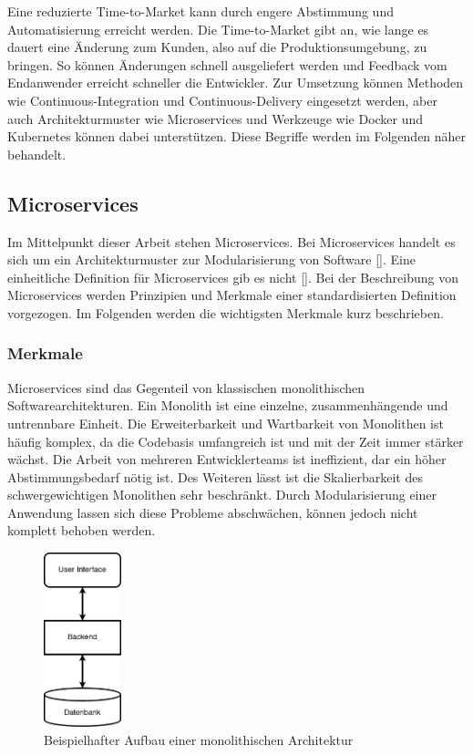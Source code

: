 Eine reduzierte Time-to-Market kann durch engere Abstimmung und Automatisierung erreicht werden. Die Time-to-Market gibt an, wie lange es dauert eine Änderung zum Kunden, also auf die Produktionsumgebung, zu bringen. So können Änderungen schnell ausgeliefert werden und Feedback vom Endanwender erreicht schneller die Entwickler. Zur Umsetzung können Methoden wie Continuous-Integration und Continuous-Delivery eingesetzt werden, aber auch Architekturmuster wie Microservices und Werkzeuge wie Docker und Kubernetes können dabei unterstützen. Diese Begriffe werden im Folgenden näher behandelt.

\subsection{Microservices}

Im Mittelpunkt dieser Arbeit stehen Microservices. Bei Microservices handelt es sich um ein Architekturmuster zur Modularisierung von Software [\cite[S. 15]{newmanMicroservices2015}]. Eine einheitliche Definition für Microservices gib es nicht [\cite[S. 2]{wolffMicroservices2018}]. Bei der Beschreibung von Microservices werden Prinzipien und Merkmale einer standardisierten Definition vorgezogen. Im Folgenden werden die wichtigsten Merkmale kurz beschrieben.

\subsubsection{Merkmale}

Microservices sind das Gegenteil von klassischen monolithischen Softwarearchitekturen. Ein Monolith ist eine einzelne, zusammenhängende und untrennbare Einheit. Die Erweiterbarkeit und Wartbarkeit von Monolithen ist häufig komplex, da die Codebasis umfangreich ist und mit der Zeit immer stärker wächst. Die Arbeit von mehreren Entwicklerteams ist ineffizient, dar ein höher Abstimmungsbedarf nötig ist. Des Weiteren lässt ist die Skalierbarkeit des schwergewichtigen Monolithen sehr beschränkt. Durch Modularisierung einer Anwendung lassen sich diese Probleme abschwächen, können jedoch nicht komplett behoben werden.

\begin{figure}[H] 
    \centering
    \includegraphics[width=0.2\textwidth]{figures/Monolith.png}
    \caption{Beispielhafter Aufbau einer monolithischen Architektur}
\end{figure}

